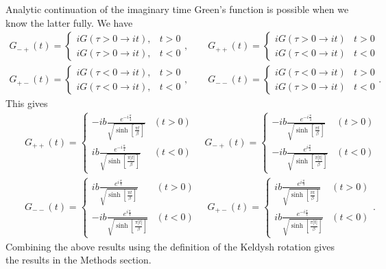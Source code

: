 \documentclass[twocolumn,floatfix,superscriptaddress]{revtex4-1}
\begin{document}
\begin{widetext}
Analytic continuation of the imaginary time Green's function is possible when we know the latter fully.  We have
\begin{eqnarray}
 G_{-+}(t)=\begin{cases} i G(\tau>0\rightarrow it), & t>0 \\
 i G(\tau>0 \rightarrow it), &t<0\end{cases}, \qquad
 G_{++}(t) =\begin{cases} i G(\tau>0\rightarrow it) & t>0\\
i G(\tau<0\rightarrow it) & t<0\end{cases}\nonumber\\
 G_{+-}(t)=\begin{cases} i G(\tau<0\rightarrow it), & t>0 \\
 i G(\tau<0 \rightarrow it), &t<0\end{cases}, \qquad
  G_{--}(t) =\begin{cases} i G(\tau<0\rightarrow it) & t>0\\
i G(\tau>0\rightarrow it) & t<0\end{cases}.
\end{eqnarray}
This gives
\begin{eqnarray}
\label{G_re}
&&G_{++}(t)=\begin{cases} -ib\frac{e^{-i\frac{\pi}{4}}}{\sqrt{\sinh[\frac{\pi t}{\beta}]}}& (t>0)\\
ib\frac{e^{-i\frac{\pi}{4}}}{\sqrt{\sinh[\frac{\pi |t|}{\beta}]}}& (t<0)\end{cases}\quad
G_{-+}(t)=\begin{cases} -ib\frac{e^{-i\frac{\pi}{4}}}{\sqrt{\sinh[\frac{\pi t}{\beta}]}}& (t>0)\\
-ib\frac{e^{i\frac{\pi}{4}}}{\sqrt{\sinh[\frac{\pi |t|}{\beta}]}}& (t<0)\end{cases}\nonumber\\
&&G_{--}(t)=\begin{cases} ib\frac{e^{i\frac{\pi}{4}}}{\sqrt{\sinh[\frac{\pi t}{\beta}]}}& (t>0)\\
-ib\frac{e^{i\frac{\pi}{4}}}{\sqrt{\sinh[\frac{\pi |t|}{\beta}]}}& (t<0)\end{cases}\quad
G_{+-}(t)=\begin{cases} ib\frac{e^{i\frac{\pi}{4}}}{\sqrt{\sinh[\frac{\pi t}{\beta}]}}& (t>0)\\
ib\frac{e^{-i\frac{\pi}{4}}}{\sqrt{\sinh[\frac{\pi |t|}{\beta}]}}& (t<0)\end{cases}.
\end{eqnarray}
Combining the above results using the definition of the Keldysh rotation gives the results in the Methods section.


\end{widetext}
\end{document}
